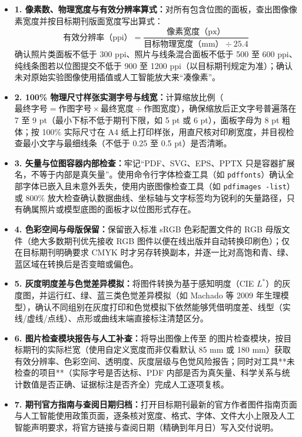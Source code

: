 \begin{itemize}
  \item[$\square$] \textbf{1. 像素数、物理宽度与有效分辨率算式：}对所有包含位图的面板，查出图像像素宽度并按目标期刊版面宽度写出算式：
  \[
    \text{有效分辨率（ppi）} = \frac{\text{像素宽度（px）}}{\text{目标物理宽度（mm）} \div 25.4}
  \]
  确认照片类面板不低于 300 ppi、照片与线条混合面板不低于 500 至 600 ppi、纯线条图若以位图提交不低于 900 至 1200 ppi（以目标期刊规定为准）；确认未对原始实验图像使用插值或人工智能放大来“凑像素”。
  \item[$\square$] \textbf{2. 100\% 物理尺寸样张实测字号与线宽：}计算缩放比例（$\text{最终字号} = \text{作图字号} \times \text{最终宽度} \div \text{作图宽度}$），确保缩放后正文字号普遍落在 7 至 9 pt（最小下标不低于期刊下限，如 5 pt 或 6 pt），面板字母为 8 pt 粗体；按 100\% 实际尺寸在 A4 纸上打印样张，用直尺核对印刷宽度，并目视检查最小文字与最细线条（不低于 0.25 至 0.5 pt）是否清晰。
  \item[$\square$] \textbf{3. 矢量与位图容器内部检查：}牢记“PDF、SVG、EPS、PPTX 只是容器扩展名，不等于内部是真矢量”。使用命令行字体检查工具（如 \texttt{pdffonts}）确认全部字体已嵌入且未意外丢失，使用内嵌图像检查工具（如 \texttt{pdfimages -list}）或 800\% 放大检查确认数据曲线、坐标轴与文字标签均为锐利的矢量路径，只有确属照片或模型底图的面板才以位图形式存在。
  \item[$\square$] \textbf{4. 色彩空间与母版保留：}保留嵌入标准 sRGB 色彩配置文件的 RGB 母版文件（绝大多数期刊优先接收 RGB 图件以便在线出版并自动转换印刷色）；仅在目标期刊明确要求 CMYK 时才另存转换副本，并逐一比对高饱和青、绿、蓝区域在转换后是否变暗或偏色。
  \item[$\square$] \textbf{5. 灰度明度差与色觉差异模拟：}将图件转换为基于感知明度（CIE $L^*$）的灰度图，并运行红、绿、蓝三类色觉差异模拟（如 Machado 等 2009 年生理模型），确认不同组别在灰度打印和色觉模拟下依然能够凭借明度差、线型（实线/虚线/点线）、点形或曲线末端直接标注清楚区分。
  \item[$\square$] \textbf{6. 图片检查模块报告与人工补查：}将导出图像上传至 \scidraw{} 的图片检查模块，按目标期刊的实际栏宽（使用自定义宽度而非仅看默认 85 mm 或 180 mm）获取有效分辨率、色彩空间、透明度、灰度层级与色觉风险报告；同时对工具**未检查的项目**（实际字号是否达标、PDF 内部是否为真矢量、科学关系与统计数值是否正确、证据标注是否齐全）完成人工逐项复核。
  \item[$\square$] \textbf{7. 期刊官方指南与查阅日期归档：}打开目标期刊最新的官方作者图件指南页面与人工智能使用政策页面，逐条核对宽度、格式、字体、文件大小上限及人工智能声明要求，将官方链接与查阅日期（精确到年月日）写入交付说明。
\end{itemize}

